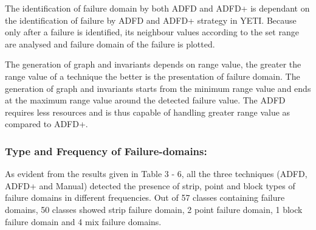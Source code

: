 The identification of failure domain by both ADFD and ADFD+ is dependant on the identification of failure by ADFD and ADFD+ strategy in YETI. Because only after a failure is identified, its neighbour values according to the set range are analysed and failure domain of the failure is plotted.

The generation of graph and invariants depends on range value, the greater the range value of a technique the better is the presentation of failure domain. The generation of graph and invariants starts from the minimum range value and ends at the maximum range value around the detected failure value. The ADFD requires less resources and is thus capable of handling  greater range value as compared to ADFD+.  








\subsubsection{Type and Frequency of Failure-domains:}
As evident from the results given in Table 3 - 6, all the three techniques (ADFD, ADFD+ and Manual) detected the presence of strip, point and block types of failure domains in different frequencies. Out of 57 classes containing failure domains, 50 classes showed strip failure domain, 2 point failure domain, 1 block failure domain and 4 mix failure domains.  


